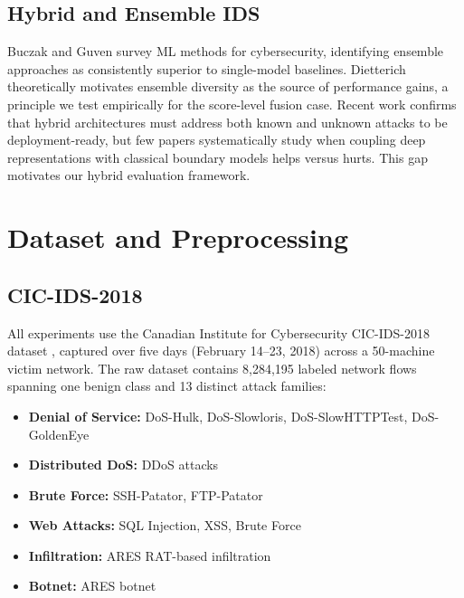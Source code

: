 \documentclass[10pt,journal,compsoc]{IEEEtran}
\begin{document}
\subsection{Hybrid and Ensemble IDS}

Buczak and Guven \cite{buczak2016} survey ML methods for
cybersecurity, identifying ensemble approaches as consistently superior
to single-model baselines.  Dietterich \cite{dietterich2000}
theoretically motivates ensemble diversity as the source of
performance gains, a principle we test empirically for the score-level
fusion case.  Recent work \cite{plosone2024, ijsse2025} confirms that
hybrid architectures must address both known and unknown attacks to be
deployment-ready, but few papers systematically study when coupling
deep representations with classical boundary models helps versus hurts.
This gap motivates our hybrid evaluation framework.

\section{Dataset and Preprocessing}
\label{sec:dataset}

\subsection{CIC-IDS-2018}

All experiments use the Canadian Institute for Cybersecurity
CIC-IDS-2018 dataset \cite{sharafaldin2018}, captured over five days
(February 14--23, 2018) across a 50-machine victim network.  The raw
dataset contains 8{,}284{,}195 labeled network flows spanning one
benign class and 13 distinct attack families:

\begin{itemize}[leftmargin=*,noitemsep]
  \item \textbf{Denial of Service:} DoS-Hulk, DoS-Slowloris,
        DoS-SlowHTTPTest, DoS-GoldenEye
  \item \textbf{Distributed DoS:} DDoS attacks
  \item \textbf{Brute Force:} SSH-Patator, FTP-Patator
  \item \textbf{Web Attacks:} SQL Injection, XSS, Brute Force
  \item \textbf{Infiltration:} ARES RAT-based infiltration
  \item \textbf{Botnet:} ARES botnet
\end{itemize}
\end{document}
